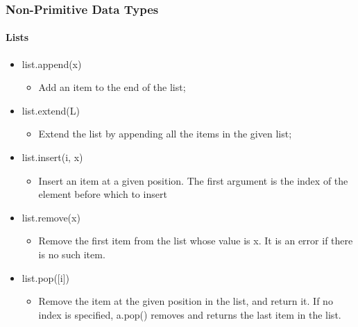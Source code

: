 \documentclass{beamer}
\begin{document}
\begin{frame}[fragile]
\frametitle{Non-Primitive Data Types}
\framesubtitle{Lists}
\begin{itemize}
	\item list.append(x)
		\begin{itemize}
		\item Add an item to the end of the list;
		\end{itemize}
	\item list.extend(L)
		\begin{itemize}
		\item Extend the list by appending all the items in the given list; 		\end{itemize}

	\item list.insert(i, x)
		\begin{itemize}
		\item Insert an item at a given position. The first argument is the 				index of the element before which to insert
		\end{itemize}

	\item list.remove(x)
		\begin{itemize}
		\item Remove the first item from the list whose value is x. It is an 				error if there is no such item.
		\end{itemize}

	\item list.pop([i])
		\begin{itemize}
		\item 	Remove the item at the given position in the list, and 					return it. If no index is specified, a.pop() removes and 					returns the last item in the list. 
		\end{itemize}

\end{itemize}


\end{frame}
\end{document}

